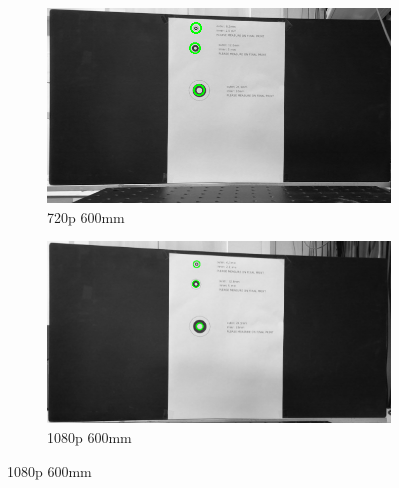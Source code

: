 \begin{figure}
    \begin{subfigure}[b]{.45\linewidth}
        \includegraphics[width=\linewidth]{bilder/project/720p600mm.png}
        \caption{720p 600mm}\label{fig:720p600mm}
    \end{subfigure}
    \begin{subfigure}[b]{.45\linewidth}
        \includegraphics[width=\linewidth]{bilder/project/1080p600mm.png}
        \caption{1080p 600mm}\label{fig:1080p600mm}
    \end{subfigure}



\end{figure}

